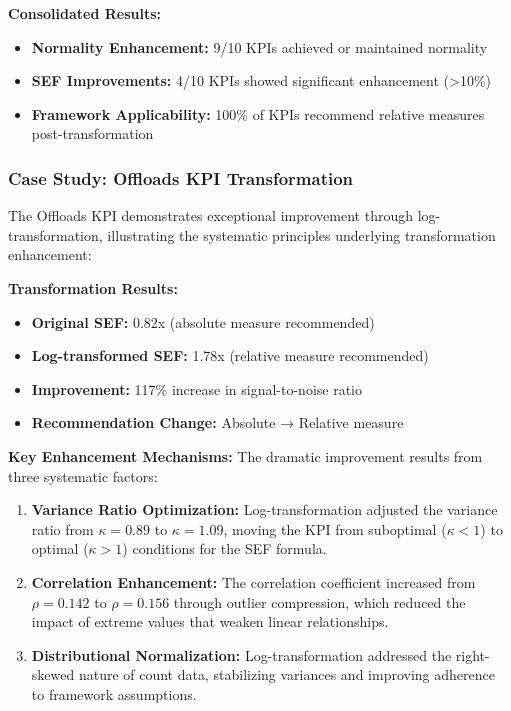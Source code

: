 \textbf{Consolidated Results:}
\begin{itemize}
    \item \textbf{Normality Enhancement:} 9/10 KPIs achieved or maintained normality
    \item \textbf{SEF Improvements:} 4/10 KPIs showed significant enhancement (>10\%)
    \item \textbf{Framework Applicability:} 100\% of KPIs recommend relative measures post-transformation
\end{itemize}

\subsubsection{Case Study: Offloads KPI Transformation}

The Offloads KPI demonstrates exceptional improvement through log-transformation, illustrating the systematic principles underlying transformation enhancement:

\textbf{Transformation Results:}
\begin{itemize}
    \item \textbf{Original SEF:} 0.82x (absolute measure recommended)
    \item \textbf{Log-transformed SEF:} 1.78x (relative measure recommended)  
    \item \textbf{Improvement:} 117\% increase in signal-to-noise ratio
    \item \textbf{Recommendation Change:} Absolute → Relative measure
\end{itemize}

\textbf{Key Enhancement Mechanisms:}
The dramatic improvement results from three systematic factors:

\begin{enumerate}
    \item \textbf{Variance Ratio Optimization:} Log-transformation adjusted the variance ratio from $\kappa = 0.89$ to $\kappa = 1.09$, moving the KPI from suboptimal ($\kappa < 1$) to optimal ($\kappa > 1$) conditions for the SEF formula.
    
    \item \textbf{Correlation Enhancement:} The correlation coefficient increased from $\rho = 0.142$ to $\rho = 0.156$ through outlier compression, which reduced the impact of extreme values that weaken linear relationships.
    
    \item \textbf{Distributional Normalization:} Log-transformation addressed the right-skewed nature of count data, stabilizing variances and improving adherence to framework assumptions.
\end{enumerate}

